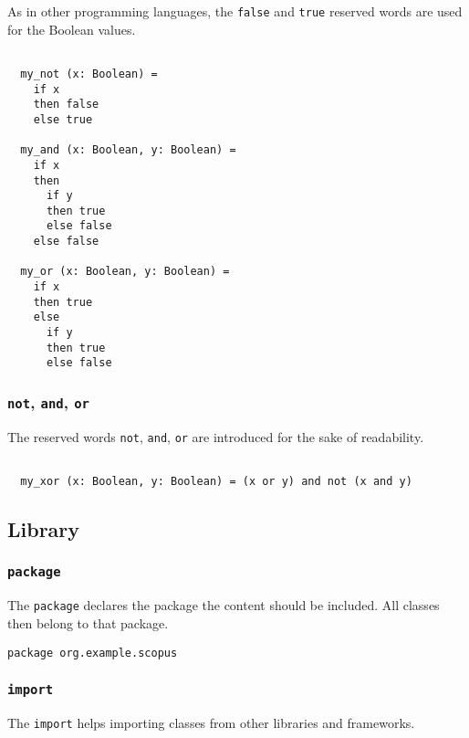 \documentclass[12pt,a4paper]{article}
\newcommand{\srccode}[1]{\texttt{{#1}}}
\newcommand{\reservedWord}[1]{{\color{blue}\srccode{#1}}\xspace}
\newcommand{\sfalse}{\reservedWord{false}}
\newcommand{\strue}{\reservedWord{true}}
\newcommand{\snot}{\reservedWord{not}}
\newcommand{\sand}{\reservedWord{and}}
\newcommand{\sor}{\reservedWord{or}}
\newcommand{\spackage}{\reservedWord{package}}
\newcommand{\simport}{\reservedWord{import}}
\begin{document}
    As in other programming languages, the \sfalse and \strue reserved words are used for the Boolean values.

    \begin{lstlisting}[label={lst:exampleFalseTrue}]

  my_not (x: Boolean) =
    if x
    then false
    else true

  my_and (x: Boolean, y: Boolean) =
    if x
    then
      if y
      then true
      else false
    else false

  my_or (x: Boolean, y: Boolean) =
    if x
    then true
    else
      if y
      then true
      else false
    \end{lstlisting}

    \subsubsection{\snot, \sand, \sor}

    The reserved words \snot, \sand, \sor are introduced for the sake of readability.

    \begin{lstlisting}[label={lst:exampleNotAndOr}]

  my_xor (x: Boolean, y: Boolean) = (x or y) and not (x and y)

    \end{lstlisting}

    \subsection{Library}

    \subsubsection{\spackage}

    The \spackage declares the package the content should be included.
    All classes then belong to that package.

    \begin{lstlisting}[label={lst:examplePackage}]
  package org.example.scopus
    \end{lstlisting}

    \subsubsection{\simport}

    The \simport helps importing classes from other libraries and frameworks.
\end{document}
